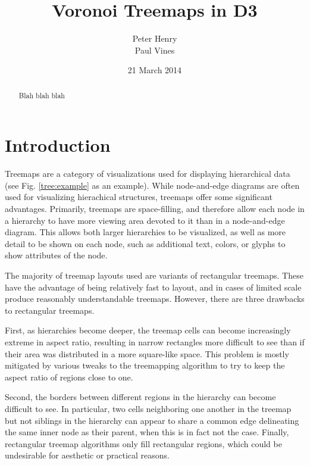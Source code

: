 \documentclass{acm_proc_article-sp} \usepackage{cite}
\begin{document}
\title{Voronoi Treemaps in D3}

 \author{ \alignauthor Peter Henry
  \\ 
  \alignauthor Paul Vines \\  } \date{21 March
  2014}

\maketitle
\begin{abstract}
Blah blah blah
\end{abstract}


\section{Introduction}
\label{sec:introduction}
Treemaps are a category of visualizations used for displaying
hierarchical data (see Fig. \ref{tree:example} as an example). While
node-and-edge diagrams are often used for visualizing hierachical
structures, treemaps offer some significant advantages. Primarily,
treemaps are space-filling, and therefore allow each node in a
hierarchy to have more viewing area devoted to it than in a
node-and-edge diagram. This allows both larger hierarchies to be
visualized, as well as more detail to be shown on each node, such as
additional text, colors, or glyphs to show attributes of the node.

The majority of treemap layouts used are variants of rectangular
treemaps. These have the advantage of being relatively fast to layout,
and in cases of limited scale produce reasonably understandable
treemaps. However, there are three drawbacks to rectangular treemaps.

First, as hierarchies become deeper, the treemap cells can become
increasingly extreme in aspect ratio, resulting in narrow rectangles
more difficult to see than if their area was distributed in a more
square-like space. This problem is mostly mitigated by various tweaks
to the treemapping algorithm to try to keep the aspect ratio of
regions close to one.

Second, the borders between different regions in the hierarchy can
become difficult to see. In particular, two cells neighboring one
another in the treemap but not siblings in the hierarchy can appear to
share a common edge delineating the same inner node as their parent,
when this is in fact not the case.  Finally, rectangular treemap
algorithms only fill rectangular regions, which could be
undesirable for aesthetic or practical reasons.
\end{document}
